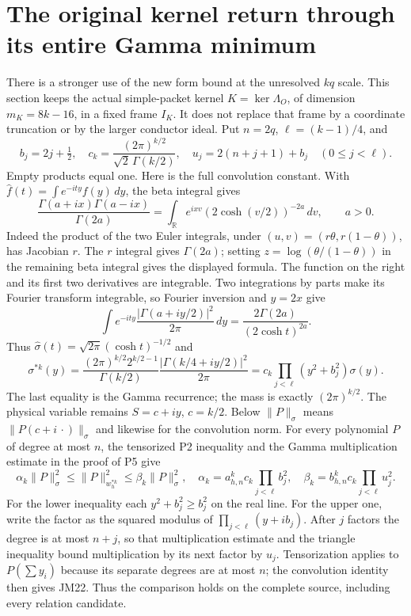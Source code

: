 \documentclass[11pt]{article}
\begin{document}
\section{The original kernel return through its entire Gamma minimum}
There is a stronger use of the new form bound at the unresolved
$kq$ scale. This section keeps the actual simple-packet kernel
$K=\ker\Lambda_O$, of dimension $m_K=8k-16$, in a fixed frame $I_K$.
It does not replace that frame by a coordinate truncation or by the
larger conductor ideal. Put $n=2q$, $\ell=(k-1)/4$, and
\[
 b_j=2j+\tfrac12,\quad
 c_k=\frac{(2\pi)^{k/2}}{\sqrt2\,\Gamma(k/2)},\quad
 u_j=2(n+j+1)+b_j\quad(0\le j<\ell).
 \tag{JM21}
\]
Empty products equal one. Here is the full convolution constant.
With $\widehat f(t)=\int e^{-ity}f(y)\,dy$, the beta integral gives
\[
 \frac{\Gamma(a+ix)\Gamma(a-ix)}{\Gamma(2a)}
 =\int_{\mathbb R}e^{ixv}(2\cosh(v/2))^{-2a}\,dv,
 \qquad a>0.
\]
Indeed the product of the two Euler integrals, under
$(u,v)=(r\theta,r(1-\theta))$, has Jacobian $r$.
The $r$ integral gives $\Gamma(2a)$; setting
$z=\log(\theta/(1-\theta))$ in the remaining beta integral gives
the displayed formula. The function on the right and its first two
derivatives are integrable. Two integrations by parts make its
Fourier transform integrable, so Fourier inversion and $y=2x$ give
\[
 \int e^{-ity}\frac{|\Gamma(a+iy/2)|^2}{2\pi}\,dy
 =\frac{2\Gamma(2a)}{(2\cosh t)^{2a}}.
\]
Thus $\widehat\sigma(t)=\sqrt{2\pi}(\cosh t)^{-1/2}$ and
\[
 \sigma^{*k}(y)=
 \frac{(2\pi)^{k/2}2^{k/2-1}}{\Gamma(k/2)}
 \frac{|\Gamma(k/4+iy/2)|^2}{2\pi}
 =c_k\prod_{j<\ell}(y^2+b_j^2)\sigma(y).
\]
The last equality is the Gamma recurrence; the mass is exactly
$(2\pi)^{k/2}$. The physical variable remains $S=c+iy$, $c=k/2$.
Below $\|P\|_\sigma$ means $\|P(c+i\,\cdot)\|_\sigma$ and likewise
for the convolution norm. For every polynomial $P$ of degree at most $n$,
the tensorized P2 inequality and the Gamma multiplication estimate
in the proof of P5 give
\[
 \alpha_k\|P\|_\sigma^2\le\|P\|_{w_h^{*k}}^2
 \le\beta_k\|P\|_\sigma^2,\quad
 \alpha_k=a_{h,n}^kc_k\prod_{j<\ell}b_j^2,\quad
 \beta_k=b_{h,n}^kc_k\prod_{j<\ell}u_j^2.\tag{JM22}
\]
For the lower inequality each $y^2+b_j^2\ge b_j^2$ on the real
line. For the upper one, write the factor as the squared modulus
of $\prod_{j<\ell}(y+ib_j)$. After $j$ factors the degree is at
most $n+j$, so that multiplication estimate and the triangle inequality bound multiplication
by its next factor by $u_j$. Tensorization applies to $P(\sum y_i)$
because its separate degrees are at most $n$; the convolution
identity then gives JM22. Thus the comparison holds on the complete
source, including every relation candidate.
\end{document}
